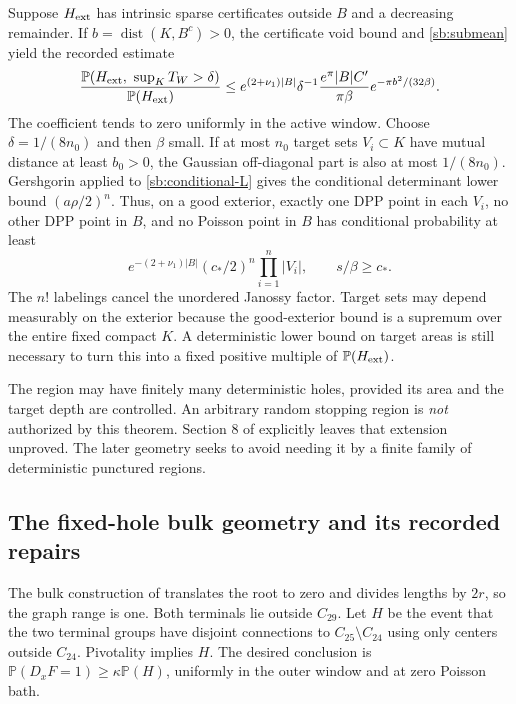 \documentclass[11pt,a4paper]{article}
\theoremstyle{definition}
\theoremstyle{remark}
\numberwithin{equation}{section}
\begin{document}
Suppose $H_{\rm ext}$ has intrinsic sparse certificates outside $B$
and a decreasing remainder. If
$b=\operatorname{dist}(K,B^c)>0$, the certificate void bound and
\eqref{sb:submean} yield the recorded estimate
\begin{equation}
 \frac{\mathbb P(H_{\rm ext},\ \sup_K T_W>\delta)}
      {\mathbb P(H_{\rm ext})}
 \le e^{(2+\nu_1)|B|}\delta^{-1}
       \frac{e^\pi |B|C'}{\pi\beta}
           e^{-\pi b^2/(32\beta)}.
 \label{sb:good-exterior}
\end{equation}
The coefficient tends to zero uniformly in the active window. Choose
$\delta=1/(8n_0)$ and then $\beta$ small. If at most $n_0$ target sets
$V_i\subset K$ have mutual distance at least $b_0>0$, the Gaussian
off-diagonal part is also at most $1/(8n_0)$. Gershgorin applied to
\eqref{sb:conditional-L} gives the conditional determinant lower bound
$(a\rho/2)^n$. Thus, on a good exterior, exactly one DPP point in each
$V_i$, no other DPP point in $B$, and no Poisson point in $B$ has
conditional probability at least
\begin{equation}
 e^{-(2+\nu_1)|B|}(c_*/2)^n\prod_{i=1}^n|V_i|,
 \qquad s/\beta\ge c_*.
 \label{sb:scaffold-probability}
\end{equation}
The $n!$ labelings cancel the unordered Janossy factor. Target sets may
depend measurably on the exterior because the good-exterior bound is a
supremum over the entire fixed compact $K$. A deterministic lower
bound on target areas is still necessary to turn this into a fixed
positive multiple of $\mathbb P(H_{\rm ext})$.

The region may have finitely many deterministic holes, provided its
area and the target depth are controlled. An arbitrary random stopping
region is \emph{not} authorized by this theorem. Section 8 of
 explicitly leaves that
extension unproved. The later geometry seeks to avoid needing it by a
finite family of deterministic punctured regions.

\subsection{The fixed-hole bulk geometry and its recorded repairs}

The bulk construction of  translates
the root to zero and divides lengths by $2r$, so the graph range is
one. Both terminals lie outside $C_{29}$. Let $H$ be the event that
the two terminal groups have disjoint connections to
$C_{25}\setminus C_{24}$ using only centers outside $C_{24}$.
Pivotality implies $H$. The desired conclusion is
$\mathbb P(D_xF=1)\ge\kappa\mathbb P(H)$, uniformly in the outer
window and at zero Poisson bath.
\end{document}
